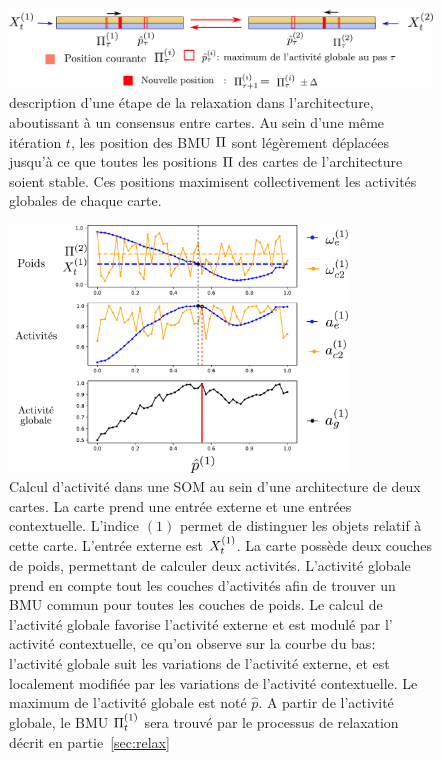\documentclass[../main]{subfiles}
\begin{document}
\begin{figure}
\centering
\includegraphics[width=\textwidth]{relaxation_2maps.pdf}
\caption{description d'une étape de la relaxation dans l'architecture, aboutissant à un consensus entre cartes. Au sein d'une même itération $t$, les position des BMU $\Pi$ sont légèrement déplacées jusqu'à ce que toutes les positions $\Pi$ des cartes de l'architecture soient stable. Ces positions maximisent collectivement les activités globales de chaque carte. \label{fig:relax}}
\end{figure}

\begin{figure}
\centering
\includegraphics[width=0.8\textwidth]{activite_layers_2maps.pdf}
\caption{Calcul d'activité dans une SOM au sein d'une architecture de deux cartes. La carte prend une entrée externe et une entrées contextuelle. L'indice $(1)$ permet de distinguer les objets relatif à cette carte. L'entrée externe est $X^{({1})}_t$. La carte possède deux couches de poids, permettant de calculer deux activités. L'activité globale prend en compte tout les couches d'activités afin de trouver un BMU commun pour toutes les couches de poids. Le calcul de l'activité globale favorise l'activité externe et est modulé par l' activité contextuelle, ce qu'on observe sur la courbe du bas: l'activité globale suit les variations de l'activité externe, et est localement modifiée par les variations de l'activité contextuelle.
Le maximum de l'activité globale est noté $\hat{p}$. A partir de l'activité globale, le BMU $\Pi^{({1})}_t$ sera trouvé par le processus de relaxation décrit en partie~\ref{sec:relax}\label{fig:2som_activite}}

\end{figure}
\end{document}
